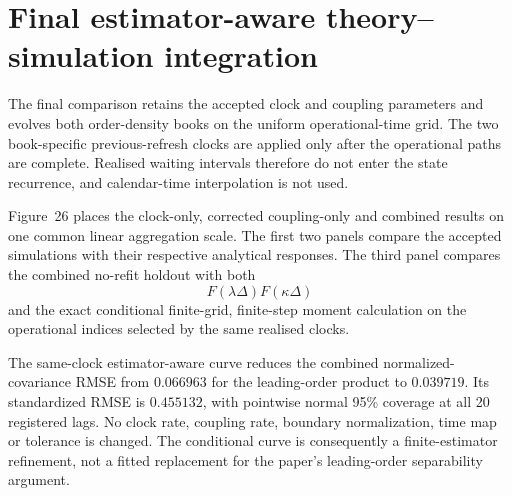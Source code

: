 
\section*{Final estimator-aware theory--simulation integration}

The final comparison retains the accepted clock and coupling parameters and
evolves both order-density books on the uniform operational-time grid. The two
book-specific previous-refresh clocks are applied only after the operational
paths are complete. Realised waiting intervals therefore do not enter the
state recurrence, and calendar-time interpolation is not used.

Figure~26 places the clock-only, corrected coupling-only and combined results
on one common linear aggregation scale. The first two panels compare the
accepted simulations with their respective analytical responses. The third
panel compares the combined no-refit holdout with both
\[
  F(\lambda\Delta)F(\kappa\Delta)
\]
and the exact conditional finite-grid, finite-step moment calculation on the
operational indices selected by the same realised clocks.

The same-clock estimator-aware curve reduces the combined normalized-
covariance RMSE from $0.066963$ for the leading-order product to $0.039719$.
Its standardized RMSE is $0.455132$, with pointwise normal 95\% coverage at
all 20 registered lags. No clock rate, coupling rate, boundary normalization,
time map or tolerance is changed. The conditional curve is consequently a
finite-estimator refinement, not a fitted replacement for the paper's
leading-order separability argument.
